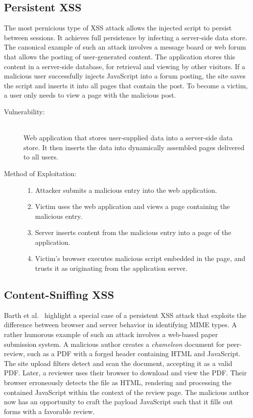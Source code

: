 \subsection{Persistent XSS}\label{sec:xss-types-persistent}

The most pernicious type of XSS attack allows the injected script to persist between sessions.
It achieves full persistence by infecting a server-side data store.
The canonical example of such an attack involves a message board or web forum that allows the posting of user-generated content.
The application stores this content in a server-side database, for retrieval and viewing by other visitors.
If a malicious user successfully injects JavaScript into a forum posting, the site saves the script and inserts it into all pages that contain the post.
To become a victim, a user only needs to view a page with the malicious post.

\begin{description}
 \item[Vulnerability:] \hfill \\
   Web application that stores user-supplied data into a server-side data store.
   It then inserts the data into dynamically assembled pages delivered to all users.
 \item[Method of Exploitation:] \hfill
  \begin{enumerate}
   \item Attacker submits a malicious entry into the web application.
   \item Victim uses the web application and views a page containing the malicious entry.
   \item Server inserts content from the malicious entry into a page of the application.
   \item Victim's browser executes malicious script embedded in the page, and trusts it as originating from the application server.
  \end{enumerate}
\end{description}

\subsection{Content-Sniffing XSS}\label{sec:xss-types-content}

Barth et al.~\cite{barth.etal+09b} highlight a special case of a persistent XSS attack that exploits the difference between browser and server behavior in identifying MIME types.
A rather humorous example of such an attack involves a web-based paper submission system.
A malicious author creates a \emph{chameleon} document for peer-review, such as a PDF with a forged header containing HTML and JavaScript.
The site upload filters detect and scan the document, accepting it as a valid PDF.
Later, a reviewer uses their browser to download and view the PDF.
Their browser erroneously detects the file as HTML, rendering and processing the contained JavaScript within the context of the review page.
The malicious author now has an opportunity to craft the payload JavaScript such that it fills out forms with a favorable review.

